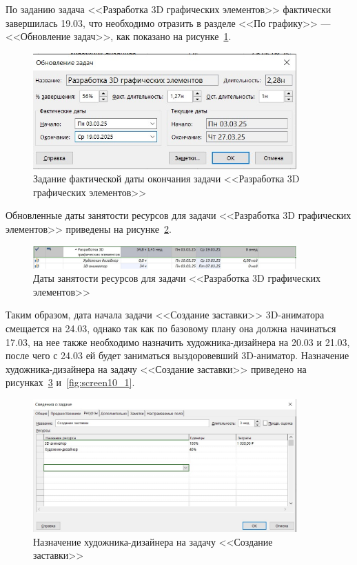 По заданию задача <<Разработка 3D графических элементов>> фактически завершилась 19.03, что необходимо отразить в разделе <<По графику>> --- <<Обновление задач>>, как показано на рисунке~\ref{fig:screen9}.

\begin{figure}[H]
	\centering
	\includegraphics[width=0.9\textwidth]{img/screen9.jpg}
	\caption{Задание фактической даты окончания задачи <<Разработка 3D графических элементов>>}
	\label{fig:screen9}
\end{figure}

Обновленные даты занятости ресурсов для задачи <<Разработка 3D графических элементов>> приведены на рисунке~\ref{fig:screen10}.

\begin{figure}[H]
	\centering
	\includegraphics[width=0.9\textwidth]{img/screen10.jpg}
	\caption{Даты занятости ресурсов для задачи <<Разработка 3D графических элементов>>}
	\label{fig:screen10}
\end{figure}

Таким образом, дата начала задачи <<Создание заставки>> 3D-аниматора смещается на 24.03, однако так как по базовому плану она должна начинаться 17.03, на нее также необходимо назначить художника-дизайнера на 20.03 и 21.03, после чего с 24.03 ей будет заниматься выздоровевший 3D-аниматор.
Назначение художника-дизайнера на задачу <<Создание заставки>> приведено на рисунках~\ref{fig:screen33} и~\ref{fig:screen10_1}.

\begin{figure}[H]
	\centering
	\includegraphics[width=0.9\textwidth]{img/screen33.jpg}
	\caption{Назначение художника-дизайнера на задачу <<Создание заставки>>}
	\label{fig:screen33}
\end{figure}

